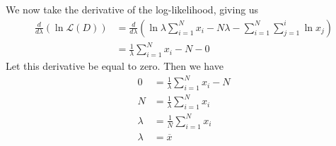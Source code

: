 \documentclass{article}
\theoremstyle{definition}
\begin{document}
        We now take the derivative of the log-likelihood, giving us 
        \begin{align*}
            \frac{d}{d\lambda}\left(
                \ln \mathcal{L}(D)
            \right) &= \frac{d}{d\lambda}\left(
                \ln \lambda \sum_{i = 1}^Nx_i - N\lambda - \sum_{i = 1}^N \sum_{j = 1}^i \ln x_j
            \right) \\
            &=\frac{1}{\lambda} \sum_{i=1}^N x_i - N - 0
        \end{align*}
        Let this derivative be equal to zero. Then we have 
        \begin{align*}
            0 &= \frac{1}{\lambda}\sum_{i=1}^N x_i - N \\
            N &= \frac{1}{\lambda} \sum_{i = 1}^N x_i \\
            \lambda &= \frac{1}{N} \sum_{i = 1}^N x_i \\
            \lambda &= \overline{x}
        \end{align*}
\end{document}
